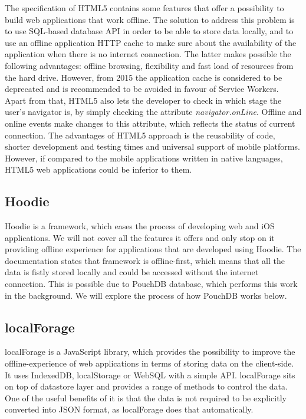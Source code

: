 The specification of HTML5 contains some features that offer a possibility to build web applications that work offline. The solution to address this problem is to use SQL-based database API in order to be able to store data locally, and to use an offline application HTTP cache to make sure about the availability of the application when there is no internet connection. The latter makes possible the following advantages: offline browsing, flexibility and fast load of resources from the hard drive\cite{20}. However, from 2015 the application cache is considered to be deprecated and is recommended to be avoided\cite{21} in favour of Service Workers. Apart from that, HTML5 also lets the developer to check in which stage the user's navigator is, by simply checking the attribute \textit{navigator.onLine}\cite{19}. Offline and online events make changes to this attribute, which reflects the status of current connection. The advantages of HTML5 approach is the reusability of code, shorter development and testing times and universal support of mobile platforms. However, if compared to the mobile applications written in native languages, HTML5 web applications could be inferior to them.
 
\subsection*{Hoodie}

Hoodie is a framework, which eases the process of developing web and iOS applications. We will not cover all the features it offers and only stop on it providing offline experience for applications that are developed using Hoodie. The documentation states that framework is offline-first\cite{23}, which means that all the data is fistly stored locally and could be accessed without the internet connection. This is possible due to PouchDB database, which performs this work in the background\cite{24}. We will explore the process of how PouchDB works below.

\subsection*{localForage}

localForage is a JavaScript library, which provides the possibility to improve the offline-experience of web applications in terms of storing data on the client-side. It uses IndexedDB, localStorage or WebSQL with a simple API. localForage sits on top of datastore layer and provides a range of methods to control the data. One of the useful benefits of it is that the data is not required to be explicitly converted into JSON format, as localForage does that automatically\cite{25}. 

